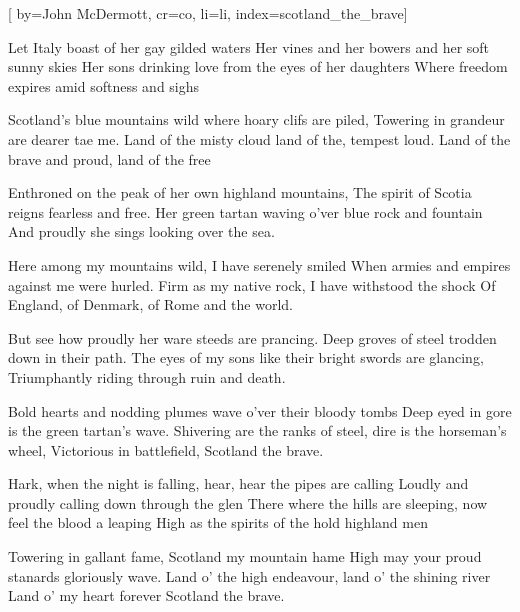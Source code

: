 

[%
    by={John McDermott},
    cr={co},
    li={li},
    index={scotland_the_brave}]


    \label{scotland_the_brave}

    \beginverse\memorize[verse]
        Let Italy boast of her gay gilded waters
        Her vines and her bowers and her soft sunny skies
        Her sons drinking love from the eyes of her daughters
        Where freedom expires amid softness and sighs
    \endverse

    \beginchorus\memorize[chorus]
        Scotland's blue mountains wild where hoary clifs are piled,
        Towering in grandeur are dearer tae me.
        Land of the misty cloud land of the, tempest loud.
        Land of the brave and proud, land of the free
    \endchorus

    \beginverse\replay[verse]
        Enthroned on the peak of her own highland mountains,
        The spirit of Scotia reigns fearless and free.
        Her green tartan waving o'ver blue rock and fountain
        And proudly she sings looking over the sea.
    \endverse

    \beginchorus\replay[chorus]
        Here among my mountains wild, I  have serenely smiled
        When armies and empires against me were hurled.
        Firm as my native rock, I have withstood the shock
        Of England, of Denmark, of Rome and the world.
    \endchorus

    \beginverse\replay[verse]
        But see how proudly her ware steeds are prancing.
        Deep groves of steel trodden down in their path.
        The eyes of my sons like their bright swords are glancing,
        Triumphantly riding through ruin and death.
    \endverse

    \beginchorus\replay[chorus]
        Bold hearts and nodding plumes wave o'ver their bloody tombs
        Deep eyed in gore is the green tartan's wave.
        Shivering are the ranks of steel, dire is the horseman's wheel,
        Victorious in battlefield, Scotland the brave.
    \endchorus

    \beginverse\replay[verse]
        Hark, when the night is falling, hear, hear the pipes are calling
        Loudly and proudly calling down through the glen
        There where the hills are sleeping, now feel the blood a leaping
        High as the spirits of the hold highland men
    \endverse

    \beginchorus\replay[chorus]
        Towering in gallant fame, Scotland my mountain hame
        High may your proud stanards gloriously wave.
        Land o' the high endeavour, land o' the shining river
        Land o' my heart forever Scotland the brave.
    \endchorus
\endsong
